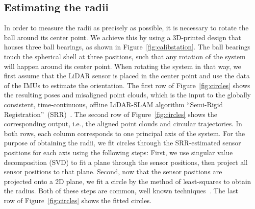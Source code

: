 \subsection{Estimating the radii}
In order to measure the radii as precisely as possible, it is necessary to rotate the ball around its center point.
We achieve this by using a 3D-printed design that houses three ball bearings, as shown in Figure~\ref{fig:calibstation}.
The ball bearings touch the spherical shell at three positions, such that any rotation of the system will happen around its center point.   
When rotating the system in that way, we first assume that the LiDAR sensor is placed in the center point and use the data of the IMUs to estimate the orientation.  
The first row of Figure~\ref{fig:circles} shows the resulting poses and misaligned point clouds, which is the input to the globally consistent, time-continuous, offline LiDAR-SLAM algorithm ``Semi-Rigid Registration''~(SRR)~\cite{srr}.
The second row of Figure~\ref{fig:circles} shows the corresponding output, i.e., the aligned point clouds and circular trajectories.
In both rows, each column corresponds to one principal axis of the system.
For the purpose of obtaining the radii, we fit circles through the SRR-estimated sensor positions for each axis using the following steps:
First, we use singular value decomposition (SVD) to fit a plane through the sensor positions, then project all sensor positions to that plane.
Second, now that the sensor positions are projected onto a 2D plane, we fit a circle by the method of least-squares to obtain the radius.
Both of these steps are common, well known techniques~\cite{geofit}.
The last row of Figure~\ref{fig:circles} shows the fitted circles.


